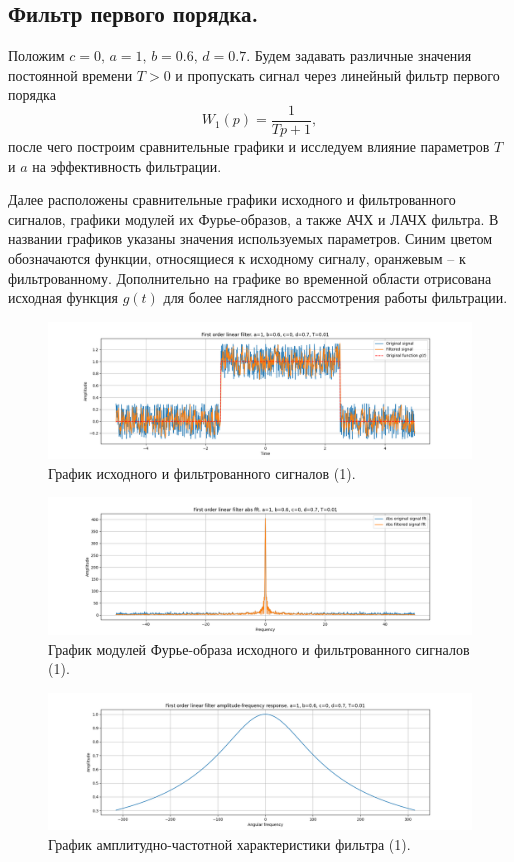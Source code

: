 \documentclass[a4paper, 12pt]{article}
\begin{document}
    \subsection{Фильтр первого порядка.}
    Положим $c=0,\,a=1,\,b=0.6,\,d=0.7$. Будем задавать различные значения постоянной времени $T>0$ и пропускать сигнал через линейный
    фильтр первого порядка $$W_1(p)=\dfrac{1}{Tp+1},$$ после чего построим сравнительные графики и исследуем влияние параметров $T$ и $a$
    на эффективность фильтрации.


    Далее расположены сравнительные графики исходного и фильтрованного сигналов, графики модулей их Фурье-образов, а также АЧХ и ЛАЧХ фильтра.
    В названии графиков указаны значения используемых параметров. Синим цветом обозначаются функции, относящиеся к исходному сигналу, оранжевым
    -- к фильтрованному. Дополнительно на графике во временной области отрисована исходная функция $g(t)$ для более наглядного рассмотрения работы
    фильтрации.
    \begin{figure}[H]
        \centering
        \includegraphics[scale=0.4]{1_filtered_linear.png}
        \captionsetup{skip=0pt}
        \caption{График исходного и фильтрованного сигналов (1).}
        \label{fig:filin1}
    \end{figure}
    \begin{figure}[H]
        \centering
        \includegraphics[scale=0.4]{1_abs_filtered_linear.png}
        \captionsetup{skip=0pt}
        \caption{График модулей Фурье-образа исходного и фильтрованного сигналов (1).}
        \label{fig:filinabs1}
    \end{figure}
    \begin{figure}[H]
        \centering
        \includegraphics[scale=0.4]{1_afr_filtered_linear.png}
        \captionsetup{skip=0pt}
        \caption{График амплитудно-частотной характеристики фильтра (1).}
        \label{fig:filinafr1}
    \end{figure}
\end{document}
